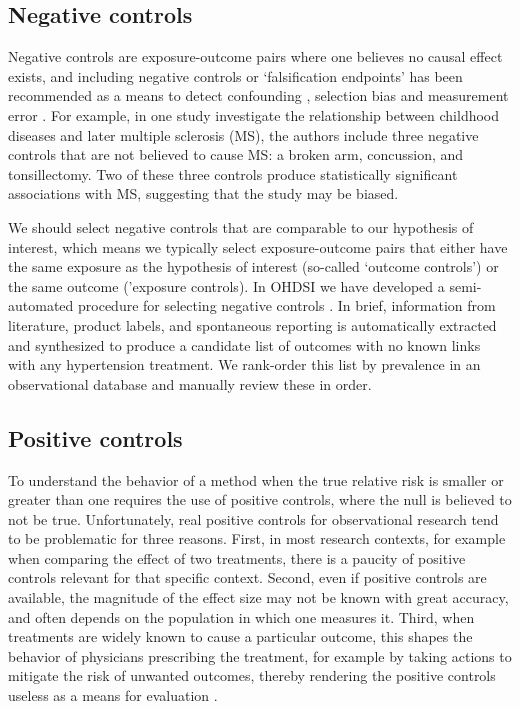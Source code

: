 \documentclass[]{book}
\begin{document}
\subsection{Negative controls}\label{negative-controls}

Negative controls are exposure-outcome pairs where one believes no
causal effect exists, and including negative controls or `falsification
endpoints' \citep{prased_2013} has been recommended as a means to detect
confounding \citep{lipsitch_2010}, selection bias and measurement error
\citep{arnold_2016}. For example, in one study \citep{zaadstra_2008}
investigate the relationship between childhood diseases and later
multiple sclerosis (MS), the authors include three negative controls
that are not believed to cause MS: a broken arm, concussion, and
tonsillectomy. Two of these three controls produce statistically
significant associations with MS, suggesting that the study may be
biased.

We should select negative controls that are comparable to our hypothesis
of interest, which means we typically select exposure-outcome pairs that
either have the same exposure as the hypothesis of interest (so-called
`outcome controls') or the same outcome ('exposure controls). In OHDSI
we have developed a semi-automated procedure for selecting negative
controls \citep{voss_2016}. In brief, information from literature,
product labels, and spontaneous reporting is automatically extracted and
synthesized to produce a candidate list of outcomes with no known links
with any hypertension treatment. We rank-order this list by prevalence
in an observational database and manually review these in order.

\subsection{Positive controls}\label{positive-controls}

To understand the behavior of a method when the true relative risk is
smaller or greater than one requires the use of positive controls, where
the null is believed to not be true. Unfortunately, real positive
controls for observational research tend to be problematic for three
reasons. First, in most research contexts, for example when comparing
the effect of two treatments, there is a paucity of positive controls
relevant for that specific context. Second, even if positive controls
are available, the magnitude of the effect size may not be known with
great accuracy, and often depends on the population in which one
measures it. Third, when treatments are widely known to cause a
particular outcome, this shapes the behavior of physicians prescribing
the treatment, for example by taking actions to mitigate the risk of
unwanted outcomes, thereby rendering the positive controls useless as a
means for evaluation \citep{noren_2014}.
\end{document}
